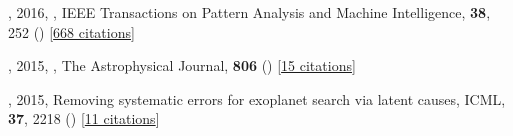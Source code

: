 \item[{\color{numcolor}\scriptsize3}] , 2016, , IEEE Transactions on Pattern Analysis and Machine Intelligence, \textbf{38}, 252 () [\href{https://scholar.google.com/scholar?cites=7122560326210979193,5194420368165307096,3347404430934682534}{668 citations}]

\item[{\color{numcolor}\scriptsize2}] , 2015, , The Astrophysical Journal, \textbf{806} () [\href{https://ui.adsabs.harvard.edu/abs/2015ApJ...806L..10D}{15 citations}]

\item[{\color{numcolor}\scriptsize1}] , 2015, Removing systematic errors for exoplanet search via latent causes, ICML, \textbf{37}, 2218 () [\href{https://scholar.google.com/scholar?cites=11768165421845046384}{11 citations}]